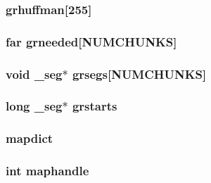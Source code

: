 \label{ID__CA_8C_a28e170b2191c9c1895b6a205499e9ed5}
\hypertarget{ID__CA_8C_a7c84a882b31be31f96afa20526b740d4}{
\subsubsection[{grhuffman}]{ {\bf grhuffman}\mbox{[}255\mbox{]}}}
\label{ID__CA_8C_a7c84a882b31be31f96afa20526b740d4}
\hypertarget{ID__CA_8C_aff6ae5a74b0467508c14a3f3b91ffd90}{
\subsubsection[{grneeded}]{ far {\bf grneeded}\mbox{[}NUMCHUNKS\mbox{]}}}
\label{ID__CA_8C_aff6ae5a74b0467508c14a3f3b91ffd90}
\hypertarget{ID__CA_8C_aa0e5c34b0901c8cc15a60fe57cb09b3a}{
\subsubsection[{grsegs}]{\setlength{\rightskip}{0pt plus 5cm}void \_\-seg$\ast$ {\bf grsegs}\mbox{[}NUMCHUNKS\mbox{]}}}
\label{ID__CA_8C_aa0e5c34b0901c8cc15a60fe57cb09b3a}
\hypertarget{ID__CA_8C_a9a8af7c3aff26b9be0edd764efef3bba}{
\subsubsection[{grstarts}]{\setlength{\rightskip}{0pt plus 5cm}long \_\-seg$\ast$ {\bf grstarts}}}
\label{ID__CA_8C_a9a8af7c3aff26b9be0edd764efef3bba}
\hypertarget{ID__CA_8C_aa09440af5bcf6e89898468325f86c2dd}{
\subsubsection[{mapdict}]{ {\bf mapdict}}}
\label{ID__CA_8C_aa09440af5bcf6e89898468325f86c2dd}
\hypertarget{ID__CA_8C_a04317788d33560e757415d06e7688914}{
\subsubsection[{maphandle}]{\setlength{\rightskip}{0pt plus 5cm}int {\bf maphandle}}}
